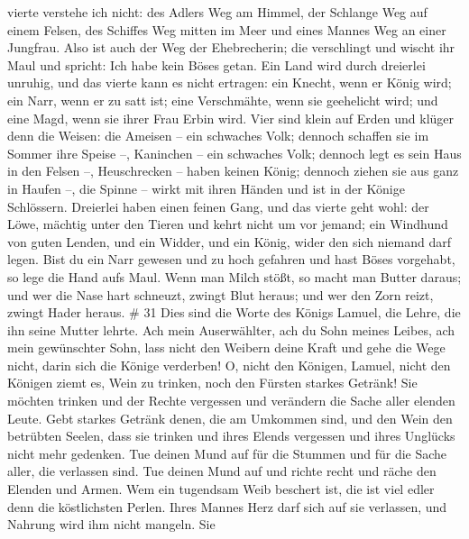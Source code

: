 vierte verstehe ich nicht:  des Adlers Weg am Himmel, der
Schlange Weg auf einem Felsen, des Schiffes Weg mitten im Meer und eines
Mannes Weg an einer Jungfrau.  Also ist auch der Weg der
Ehebrecherin; die verschlingt und wischt ihr Maul und spricht: Ich habe
kein Böses getan.  Ein Land wird durch dreierlei unruhig,
und das vierte kann es nicht ertragen:  ein Knecht, wenn er
König wird; ein Narr, wenn er zu satt ist;  eine
Verschmähte, wenn sie geehelicht wird; und eine Magd, wenn sie ihrer
Frau Erbin wird.  Vier sind klein auf Erden und klüger denn
die Weisen:  die Ameisen -- ein schwaches Volk; dennoch
schaffen sie im Sommer ihre Speise --,  Kaninchen -- ein
schwaches Volk; dennoch legt es sein Haus in den Felsen --,
 Heuschrecken -- haben keinen König; dennoch ziehen sie aus
ganz in Haufen --,  die Spinne -- wirkt mit ihren Händen
und ist in der Könige Schlössern.  Dreierlei haben einen
feinen Gang, und das vierte geht wohl:  der Löwe, mächtig
unter den Tieren und kehrt nicht um vor jemand;  ein
Windhund von guten Lenden, und ein Widder, und ein König, wider den sich
niemand darf legen.  Bist du ein Narr gewesen und zu hoch
gefahren und hast Böses vorgehabt, so lege die Hand aufs Maul.
 Wenn man Milch stößt, so macht man Butter daraus; und wer
die Nase hart schneuzt, zwingt Blut heraus; und wer den Zorn reizt,
zwingt Hader heraus. \# 31  Dies sind die Worte des Königs
Lamuel, die Lehre, die ihn seine Mutter lehrte.  Ach mein
Auserwählter, ach du Sohn meines Leibes, ach mein gewünschter Sohn,
 lass nicht den Weibern deine Kraft und gehe die Wege nicht,
darin sich die Könige verderben!  O, nicht den Königen,
Lamuel, nicht den Königen ziemt es, Wein zu trinken, noch den Fürsten
starkes Getränk!  Sie möchten trinken und der Rechte
vergessen und verändern die Sache aller elenden Leute.  Gebt
starkes Getränk denen, die am Umkommen sind, und den Wein den betrübten
Seelen,  dass sie trinken und ihres Elends vergessen und
ihres Unglücks nicht mehr gedenken.  Tue deinen Mund auf für
die Stummen und für die Sache aller, die verlassen sind. 
Tue deinen Mund auf und richte recht und räche den Elenden und Armen.
 Wem ein tugendsam Weib beschert ist, die ist viel edler
denn die köstlichsten Perlen.  Ihres Mannes Herz darf sich
auf sie verlassen, und Nahrung wird ihm nicht mangeln.  Sie
